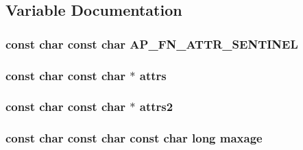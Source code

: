 \subsection{Variable Documentation}
\subsubsection[{\texorpdfstring{A\+P\+\_\+\+F\+N\+\_\+\+A\+T\+T\+R\+\_\+\+S\+E\+N\+T\+I\+N\+EL}{AP_FN_ATTR_SENTINEL}}]{\setlength{\rightskip}{0pt plus 5cm}const char const char A\+P\+\_\+\+F\+N\+\_\+\+A\+T\+T\+R\+\_\+\+S\+E\+N\+T\+I\+N\+EL}\hypertarget{group__APACHE__CORE__COOKIE_ga6e3125e186e4a9b2c5f0a405413f249a}{}\label{group__APACHE__CORE__COOKIE_ga6e3125e186e4a9b2c5f0a405413f249a}
\subsubsection[{\texorpdfstring{attrs}{attrs}}]{\setlength{\rightskip}{0pt plus 5cm}const char const char $\ast$ attrs}\hypertarget{group__APACHE__CORE__COOKIE_ga15763078452b250115cbc4984012a3c5}{}\label{group__APACHE__CORE__COOKIE_ga15763078452b250115cbc4984012a3c5}
\subsubsection[{\texorpdfstring{attrs2}{attrs2}}]{\setlength{\rightskip}{0pt plus 5cm}const char const char $\ast$ attrs2}\hypertarget{group__APACHE__CORE__COOKIE_gab566f9970f88284796f00db853ab982a}{}\label{group__APACHE__CORE__COOKIE_gab566f9970f88284796f00db853ab982a}
\subsubsection[{\texorpdfstring{maxage}{maxage}}]{\setlength{\rightskip}{0pt plus 5cm}const char const char const char long maxage}\hypertarget{group__APACHE__CORE__COOKIE_ga846f24530366d967942121cbfdca1ea7}{}\label{group__APACHE__CORE__COOKIE_ga846f24530366d967942121cbfdca1ea7}
